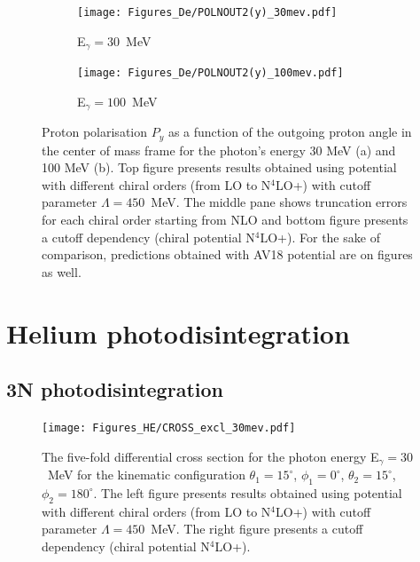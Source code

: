     \begin{figure}[h]
        \centering
        \begin{subfigure}[b]{0.46\textwidth}
            \texttt{[image: Figures\_De/POLNOUT2(y)\_30mev.pdf]}
            \caption{\small E$_\gamma = 30$~MeV}
            \label{PY_30_vert}
        \end{subfigure}
        \begin{subfigure}[b]{0.46\textwidth}
            \texttt{[image: Figures\_De/POLNOUT2(y)\_100mev.pdf]}
            \caption{\small E$_\gamma = 100$~MeV}
            \label{PY_100_vert}
        \end{subfigure}
        \caption{Proton polarisation $P_y$ 
        as a function of the outgoing proton angle in the center of mass frame 
        for the photon's energy 30 MeV (a) and 100 MeV (b).
        Top figure presents results obtained using potential
        with different chiral orders (from LO to N$^4$LO+) with cutoff parameter $\Lambda=450$~MeV.
        The middle pane shows truncation errors for each 
        chiral order starting from NLO and
        bottom figure presents a cutoff dependency (chiral potential N$^4$LO+).
        For the sake of comparison, predictions obtained with AV18 potential are on  figures as well.}
    \end{figure}

\clearpage

\section{Helium photodisintegration}

\subsection{3N photodisintegration}
    \begin{figure}[h]
        \begin{center}
            \texttt{[image: Figures\_HE/CROSS\_excl\_30mev.pdf]}
            \end{center}
            \caption{The five-fold differential cross section for the photon 
            energy E$_\gamma=30$~MeV for the kinematic configuration
            $\theta_1 = 15^\circ$, $\phi_1 = 0^\circ$,
            $\theta_2 = 15^\circ$, $\phi_2 = 180^\circ$.
            The left figure presents results obtained using potential
            with different chiral orders (from LO to N$^4$LO+) with cutoff parameter $\Lambda=450$~MeV.
            The right figure presents a cutoff dependency (chiral potential N$^4$LO+).}
            \label{CROSS_HE_EXCL_30}
        \end{figure}


